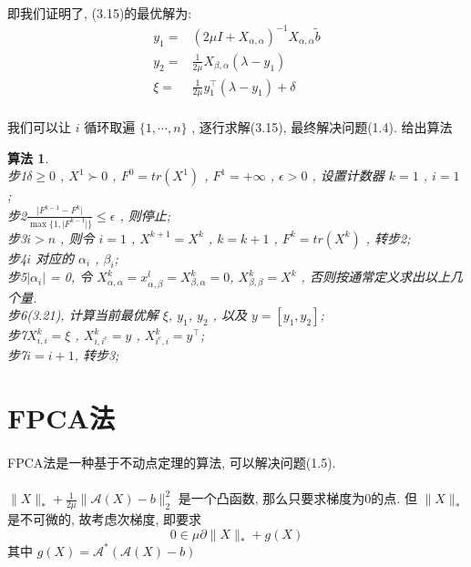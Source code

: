 \documentclass[UTF8]{ctexart}
\newtheorem{algo}{算法}
\newcommand{\s}{\quad}
\newcommand{\sect}{\section}
\newcommand{\equSplit}[1]{\begin{equation}\begin{split}#1\end{split}\end{equation}}
\newcommand{\abs}[1]{\lvert#1\rvert}
\newcommand{\norm}[1]{\lVert#1\rVert}
\newcommand{\nunorm}{\norm{X}_*}
\numberwithin{equation}{section}
\begin{document}
			
		\paragraph{}\quad 即我们证明了, (3.15)的最优解为:
			\equSplit{
				y_1 = & (2 \mu I + X_{\alpha, \alpha})^{-1} X_{\alpha, \alpha}\tilde{b}\\
				y_2 = & \frac{1}{2 \mu} X_{\beta, \alpha} (\lambda - y_1)\\
				\xi = & \frac{1}{2 \mu} y_1^\top (\lambda - y_1) + \delta
			}

		\paragraph{}\quad 我们可以让 $i$ 循环取遍 $\{1, \cdots, n\}$ , 逐行求解(3.15), 最终解决问题(1.4). 给出算法
			\begin{algo}
				\s\\
				步1 $\delta \ge 0$ , $X^1 \succ 0$ , $F^0 = tr(X^1)$ , $F^1=+\infty$ , $\epsilon>0$ , 设置计数器 $k=1$ , $i=1$ ;\\
				步2 $\frac{\abs{F^{k-1}-F^k}}{\max\{1,\abs{F^{k-1}}\}}\leq\epsilon$ , 则停止;\\
				步3 $i>n$ , 则令 $i=1$ , $X^{k+1}=X^k$ , $k=k+1$ , $F^k = tr(X^k)$ , 转步2;\\
				步4 $i$ 对应的 $\alpha_i$ , $\beta_i$;\\
				步5 $\vert{\alpha_i}\vert$ = 0, 令 $X^k_{\alpha, \alpha} = x^l_{\alpha, \beta} = X^k_{\beta, \alpha} = 0$, $X^k_{\beta, \beta} = X^k$ , 否则按通常定义求出以上几个量.\\
				步6(3.21), 计算当前最优解 $\xi$, $y_1$, $y_2$ , 以及 $y = [y_1, y_2]$;\\
				步7 $X^{k}_{i, i}=\xi$ , $X^{k}_{i,i^c} = y$ , $X^{k}_{i^c,i}=y^\top$;\\
				步7\s$i=i+1$, 转步3;
			\end{algo}


	\sect{FPCA法}
		\paragraph{}\quad FPCA法是一种基于不动点定理的算法, 可以解决问题(1.5). 

		\paragraph{}\quad $\nunorm+\frac{1}{2\mu}\norm{\mathcal{A}(X)-b}_2^2$ 是一个凸函数, 那么只要求梯度为0的点. 但 $\nunorm$ 是不可微的, 故考虑次梯度, 即要求
			\begin{equation}
				0 \in \mu \partial \nunorm + g(X)
			\end{equation}
			其中 $g(X) = \mathcal{A}^*(\mathcal{A}(X) - b)$
		
\end{document}
